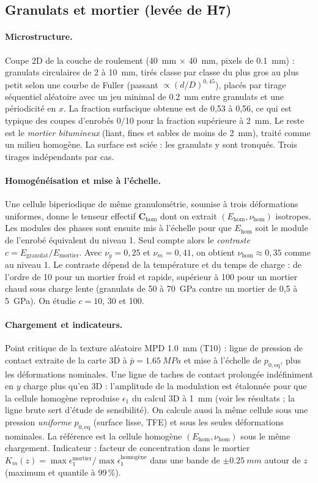 \subsection{Granulats et mortier (levée de H7)}\label{sec:n2_mortier}
\paragraph{Microstructure.} Coupe 2D de la couche de roulement (\SI{40}{mm} $\times$ \SI{40}{mm},
pixels de \SI{0.1}{mm}) : granulats circulaires de 2 à \SI{10}{mm}, tirés classe par classe du plus
gros au plus petit selon une courbe de Fuller (passant $\propto(d/D)^{0{,}45}$), placés par
tirage séquentiel aléatoire avec un jeu minimal de \SI{0.2}{mm} entre granulats et une
périodicité en $x$. La fraction surfacique obtenue est de 0,53 à 0,56, ce qui est typique des
coupes d'enrobés 0/10 pour la fraction supérieure à \SI{2}{mm}. Le reste est le \emph{mortier
bitumineux} (liant, fines et sables de moins de \SI{2}{mm}), traité comme un milieu homogène. La
surface est sciée : les granulats y sont tronqués. Trois tirages indépendants par cas.
\paragraph{Homogénéisation et mise à l'échelle.} Une cellule biperiodique de même granulométrie,
soumise à trois déformations uniformes, donne le tenseur effectif $\bm C_{\text{hom}}$ dont on
extrait $(E_{\text{hom}},\nu_{\text{hom}})$ isotropes. Les modules des phases sont ensuite mis à
l'échelle pour que $E_{\text{hom}}$ soit le module de l'enrobé équivalent du niveau 1. Seul compte
alors le \emph{contraste} $c=E_{\text{granulat}}/E_{\text{mortier}}$. Avec $\nu_g=0{,}25$ et
$\nu_m=0{,}41$, on obtient $\nu_{\text{hom}}\approx0{,}35$ comme au niveau 1. Le contraste dépend
de la température et du temps de charge : de l'ordre de 10 pour un mortier froid et rapide,
supérieur à 100 pour un mortier chaud sous charge lente (granulats de 50 à \SI{70}{GPa} contre un
mortier de 0,5 à \SI{5}{GPa}). On étudie $c=10$, 30 et 100.
\paragraph{Chargement et indicateurs.} Point critique de la texture aléatoire MPD \SI{1.0}{mm}
(T10) : ligne de pression de contact extraite de la carte 3D à $\bar p=\SI{1.65}{MPa}$ et mise à
l'échelle de $p_{0,\text{eq}}$, plus les déformations nominales. Une ligne de taches de contact
prolongée indéfiniment en $y$ charge plus qu'en 3D : l'amplitude de la modulation est étalonnée
pour que la cellule homogène reproduise $\epsilon_1$ du calcul 3D à \SI{1}{mm} (voir les
résultats ; la ligne brute sert d'étude de sensibilité). On calcule aussi la même cellule
sous une pression \emph{uniforme} $p_{0,\text{eq}}$ (surface lisse, TFE) et sous les seules
déformations nominales. La référence est la cellule homogène $(E_{\text{hom}},\nu_{\text{hom}})$
sous le même chargement. Indicateur : facteur de concentration dans le mortier
$K_m(z)=\max\epsilon_1^{\text{mortier}}/\max\epsilon_1^{\text{homogène}}$ dans une bande de
$\pm\SI{0.25}{mm}$ autour de $z$ (maximum et quantile à 99\,\%).
